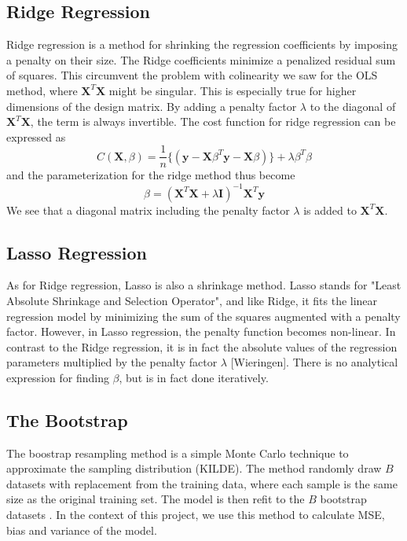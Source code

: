 \documentclass{article}
\begin{document}
\subsection{Ridge Regression}
Ridge regression is a method for shrinking the regression coefficients by imposing a penalty on their size. The Ridge coefficients minimize a penalized residual sum of squares. This circumvent the problem with colinearity we saw for the OLS method, where $\textbf{X}^{T}\textbf{X}$ might be singular. This is especially true for higher dimensions of the design matrix. By adding a penalty factor $\lambda$ to the diagonal of $\textbf{X}^{T}\textbf{X}$, the term is always invertible. The cost function for ridge regression can be expressed as
\begin{equation}
C(\textbf{X},\beta) = \dfrac{1}{n} \{( \textbf{y}-\textbf{X}\beta^{T}\textbf{y}-\textbf{X}\beta)\} + \lambda \beta^{T} \beta 
\end{equation}
and the parameterization for the ridge method thus become
\begin{equation}
\beta = (\textbf{X}^{T}\textbf{X} + \lambda\textbf{I})^{-1}\textbf{X}^{T}\textbf{y}
\end{equation}
We see that a diagonal matrix including the penalty factor $\lambda$ is added to $\textbf{X}^{T}\textbf{X}$. 
\subsection{Lasso Regression}
As for Ridge regression, Lasso is also a shrinkage method. Lasso stands for "Least Absolute Shrinkage and Selection Operator", and like Ridge, it fits the linear regression model by minimizing the sum of the squares augmented with a penalty factor. However, in Lasso regression, the penalty function becomes non-linear. In contrast to the Ridge regression, it is in fact the absolute values of the regression parameters multiplied by the penalty factor $\lambda$ [Wieringen]. There is no analytical expression for finding $\beta$, but is in fact done iteratively. 
\subsection{The Bootstrap}
The boostrap resampling method is a simple Monte Carlo technique to approximate the sampling distribution (KILDE). The method randomly draw $B$ datasets with replacement from the training data, where each sample is the same size as the original training set. The model is then refit to the $B$ bootstrap datasets \cite{Hastie et al.}. In the context of this project, we use this method to calculate MSE, bias and variance of the model.
\end{document}
